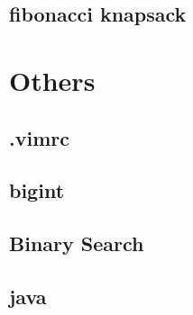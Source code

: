 \documentclass[a4paper,5pt,twocolumn,titlepage]{article}
\begin{document}
\subsection{fibonacci knapsack}


\section{Others}
\subsection{.vimrc}

\subsection{bigint}

\subsection{Binary Search}

\subsection{java}


\end{document}
